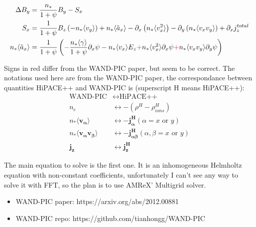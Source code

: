\documentclass{article}
\begin{document}
\begin{subequations}
    \begin{align}
    \Delta B_y &= \frac{n_*}{1+\psi} B_y - S_x \\
    S_x &= \frac{1}{1+\psi} B_z \left(-n_* \langle v_y\rangle \right) + n_* \langle \tilde{a}_x \rangle - \partial_x\left( n_*\langle v_x^2 \rangle \right) - \partial_y\left( n_*\langle v_x v_y \rangle \right) + \partial_x j_z^{total} \\
    n_* \langle \tilde{a}_x \rangle &= \frac{1}{1+\psi} \left( \textcolor{red}{-}\frac{n_*\langle\gamma\rangle}{1+\psi}\partial_x\psi - n_* \langle v_x \rangle E_z \textcolor{red}{+} n_* \langle v_x^2\rangle \partial_x\psi \textcolor{red}{+} n_* \langle v_x v_y \rangle \partial_y\psi \right) \\
    \end{align}
\end{subequations}

Signs in red differ from the WAND-PIC paper, but seem to be correct. The notations used here are from the WAND-PIC paper, the correspondance between quantities HiPACE++ and WAND-PIC is (superscript H means HiPACE++):
\begin{subequations}
\begin{align}
\text{WAND-PIC} &\leftrightarrow \text{HiPACE++} \\
n_e &\leftrightarrow -(\rho^H-\rho_{ions}^H) \\
n_*\langle \bm{v_\alpha}\rangle &\leftrightarrow -\bm{j_\alpha^H} (\alpha = x \text{ or } y) \\
n_*\langle \bm{v_\alpha v_\beta}\rangle &\leftrightarrow -\bm{j_{\alpha\beta}^H} (\alpha, \beta = x \text{ or } y) \\
\bm{j_z} &\leftrightarrow \bm{j_z^H}
\end{align}
\end{subequations}

The main equation to solve is the first one. It is an inhomogeneous Helmholtz equation with non-constant coefficients, unfortunately I can't see any way to solve it with FFT, so the plan is to use AMReX' Multigrid solver.

\begin{itemize}
\item WAND-PIC paper: https://arxiv.org/abs/2012.00881
\item WAND-PIC repo: https://github.com/tianhongg/WAND-PIC
\end{itemize}
\end{document}
